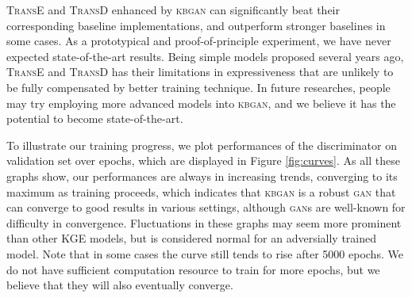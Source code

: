 \documentclass[11pt,a4paper]{article}
\begin{document}
\textsc{TransE} and \textsc{TransD} enhanced by \textsc{kbgan} can significantly beat their corresponding baseline implementations, and outperform stronger baselines in some cases. As a prototypical and proof-of-principle experiment, we have never expected state-of-the-art results. Being simple models proposed several years ago, \textsc{TransE} and \textsc{TransD} has their limitations in expressiveness that are unlikely to be fully compensated by better training technique. In future researches, people may try employing more advanced models into \textsc{kbgan},  and we believe it has the potential to become state-of-the-art.

To illustrate our training progress, we plot performances of the discriminator on validation set over epochs, which are displayed in Figure \ref{fig:curves}. As all these graphs show, our performances are always in increasing trends, converging to its maximum as training proceeds, which indicates that \textsc{kbgan} is a robust \textsc{gan} that can converge to good results in various settings, although \textsc{gan}s are well-known for difficulty in convergence. Fluctuations in these graphs may seem more prominent than other KGE models, but is considered normal for an adversially trained model. Note that in some cases the curve still tends to rise after 5000 epochs. We do not have sufficient computation resource to train for more epochs, but we believe that they will also eventually converge.
\end{document}
